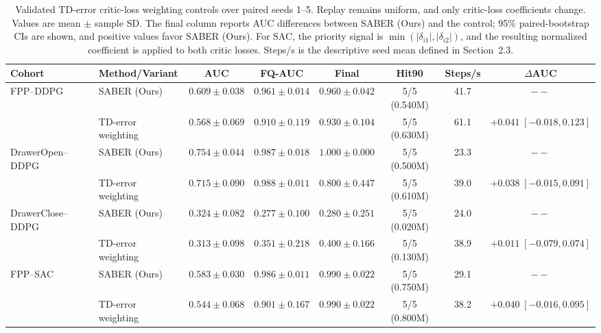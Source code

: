 \begin{table}[t]
\centering
\small
\setlength{\tabcolsep}{2.3pt}
\begin{tabular*}{\textwidth}{@{\extracolsep{\fill}}llcccccc@{}}
\toprule
Cohort & Method/Variant & AUC & FQ-AUC & Final & Hit90 & Steps/s &
$\Delta$AUC \\
\midrule
FPP--DDPG & SABER (Ours) & $0.609\pm0.038$ & $0.961\pm0.014$ &
$0.960\pm0.042$ & 5/5 (0.540M) & 41.7 & $--$ \\
 & TD-error weighting & $0.568\pm0.069$ & $0.910\pm0.119$ &
$0.930\pm0.104$ & 5/5 (0.630M) & 61.1 &
$+0.041\;[-0.018,0.123]$ \\
\addlinespace
DrawerOpen--DDPG & SABER (Ours) & $0.754\pm0.044$ & $0.987\pm0.018$ &
$1.000\pm0.000$ & 5/5 (0.500M) & 23.3 & $--$ \\
 & TD-error weighting & $0.715\pm0.090$ & $0.988\pm0.011$ &
$0.800\pm0.447$ & 5/5 (0.610M) & 39.0 &
$+0.038\;[-0.015,0.091]$ \\
\addlinespace
DrawerClose--DDPG & SABER (Ours) & $0.324\pm0.082$ & $0.277\pm0.100$ &
$0.280\pm0.251$ & 5/5 (0.020M) & 24.0 & $--$ \\
 & TD-error weighting & $0.313\pm0.098$ & $0.351\pm0.218$ &
$0.400\pm0.166$ & 5/5 (0.130M) & 38.9 &
$+0.011\;[-0.079,0.074]$ \\
\addlinespace
FPP--SAC & SABER (Ours) & $0.583\pm0.030$ & $0.986\pm0.011$ &
$0.990\pm0.022$ & 5/5 (0.750M) & 29.1 & $--$ \\
 & TD-error weighting & $0.544\pm0.068$ & $0.901\pm0.167$ &
$0.990\pm0.022$ & 5/5 (0.800M) & 38.2 &
$+0.040\;[-0.016,0.095]$ \\
\bottomrule
\end{tabular*}
\caption{Validated TD-error critic-loss weighting controls over paired seeds
1--5. Replay remains uniform, and only critic-loss coefficients change.
Values are mean $\pm$ sample SD. The final column reports AUC differences between SABER (Ours) and the control;
95\% paired-bootstrap CIs are shown, and positive values favor SABER (Ours).
For SAC, the priority signal is
$\min(|\delta_{i1}|,|\delta_{i2}|)$, and the resulting normalized
coefficient is applied to both critic losses. Steps/s is the descriptive seed
mean defined in Section~2.3.}
\label{tab:supp-td-error-weighting}
\end{table}
